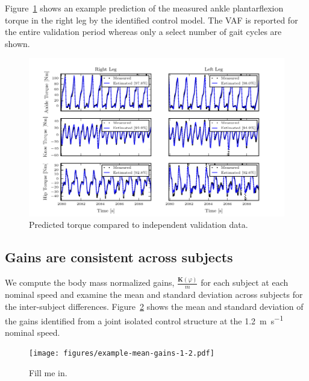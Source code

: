 \documentclass{article}
\begin{document}
Figure~\ref{fig:example-fit} shows an example prediction of the measured ankle
plantarflexion torque in the right leg by the identified control model. The VAF
is reported for the entire validation period whereas only a select number of
gait cycles are shown. 
%
\begin{figure}
  \begin{center}
    \includegraphics{figures/example-identified-joint-isolated-fit.pdf}
    \caption{Predicted torque compared to independent validation data.}
    \label{fig:example-fit}
  \end{center}
\end{figure}

\subsection*{Gains are consistent across subjects}
%
We compute the body mass normalized gains, $\frac{\mathbf{K}(\varphi)}{m}$ for
each subject at each nominal speed and examine the mean and standard deviation
across subjects for the inter-subject differences.
Figure~\ref{fig:mean-gains-1-2} shows the mean and standard deviation of the
gains identified from a joint isolated control structure at the
1.2~\si{\meter\per\second} nominal speed.
%
\begin{figure}
  \begin{center}
    \texttt{[image: figures/example-mean-gains-1-2.pdf]}
    \caption{Fill me in.}
    \label{fig:mean-gains-1-2}
  \end{center}
\end{figure}
\end{document}
